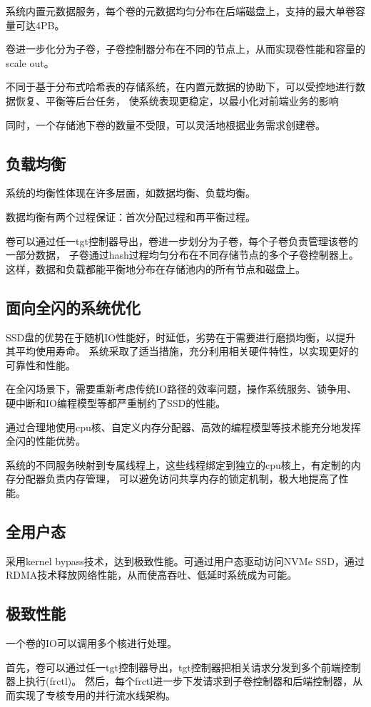 
系统内置元数据服务，每个卷的元数据均匀分布在后端磁盘上，支持的最大单卷容量可达4PB。

卷进一步化分为子卷，子卷控制器分布在不同的节点上，从而实现卷性能和容量的scale out。

不同于基于分布式哈希表的存储系统，在内置元数据的协助下，可以受控地进行数据恢复、平衡等后台任务，
使系统表现更稳定，以最小化对前端业务的影响

同时，一个存储池下卷的数量不受限，可以灵活地根据业务需求创建卷。

\subsection{负载均衡}

系统的均衡性体现在许多层面，如数据均衡、负载均衡。

数据均衡有两个过程保证：首次分配过程和再平衡过程。

卷可以通过任一tgt控制器导出，卷进一步划分为子卷，每个子卷负责管理该卷的一部分数据，
子卷通过hash过程均匀分布在不同存储节点的多个子卷控制器上。
这样，数据和负载都能平衡地分布在存储池内的所有节点和磁盘上。



\subsection{面向全闪的系统优化}

SSD盘的优势在于随机IO性能好，时延低，劣势在于需要进行磨损均衡，以提升其平均使用寿命。
系统采取了适当措施，充分利用相关硬件特性，以实现更好的可靠性和性能。

在全闪场景下，需要重新考虑传统IO路径的效率问题，操作系统服务、锁争用、硬中断和IO编程模型等都严重制约了SSD的性能。

通过合理地使用cpu核、自定义内存分配器、高效的编程模型等技术能充分地发挥全闪的性能优势。

系统的不同服务映射到专属线程上，这些线程绑定到独立的cpu核上，有定制的内存分配器负责内存管理，
可以避免访问共享内存的锁定机制，极大地提高了性能。

\subsection{全用户态}

采用kernel bypass技术，达到极致性能。可通过用户态驱动访问NVMe SSD，通过RDMA技术释放网络性能，从而使高吞吐、低延时系统成为可能。

\subsection{极致性能}


一个卷的IO可以调用多个核进行处理。

首先，卷可以通过任一tgt控制器导出，tgt控制器把相关请求分发到多个前端控制器上执行(frctl)。
然后，每个frctl进一步下发请求到子卷控制器和后端控制器，从而实现了专核专用的并行流水线架构。
